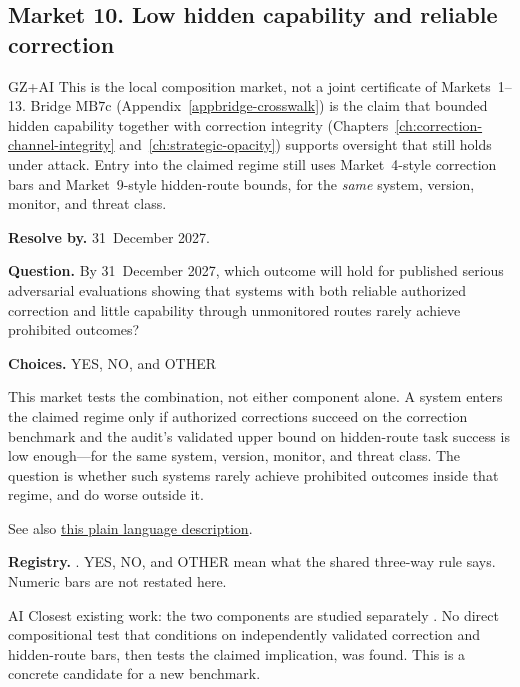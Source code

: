 \subsection{Market 10. Low hidden capability and reliable correction}
\label{sec:appp-m10}

\begin{authbar}{GZ+AI}
This is the local composition market, not a joint certificate of Markets~1--13.
Bridge \(\text{MB7c}\) (Appendix~\ref{appbridge-crosswalk}) is the claim that bounded hidden capability together with correction integrity (Chapters~\ref{ch:correction-channel-integrity} and~\ref{ch:strategic-opacity}) supports oversight that still holds under attack.
Entry into the claimed regime still uses Market~4-style correction bars and Market~9-style hidden-route bounds, for the \emph{same} system, version, monitor, and threat class.
\end{authbar}
\begin{predictionbox}
\textbf{Resolve by.} 31~December 2027.

\textbf{Question.}
By 31~December 2027, which outcome will hold for published serious adversarial evaluations showing that systems with both reliable authorized correction and little capability through unmonitored routes rarely achieve prohibited outcomes?

\textbf{Choices.} YES, NO, and OTHER
\end{predictionbox}
\begin{predictionbackground}
This market tests the combination, not either component alone.
A system enters the claimed regime only if authorized corrections succeed on the correction benchmark and the audit's validated upper bound on hidden-route task success is low enough---for the same system, version, monitor, and threat class.
The question is whether such systems rarely achieve prohibited outcomes inside that regime, and do worse outside it.

See also \href{https://towards-alignment.com/cards/correction-channel-integrity/}{this plain language description}.
\end{predictionbackground}
\begin{predictionresolution}
\textbf{Registry.} . YES, NO, and OTHER mean what the shared three-way rule says. Numeric bars are not restated here.
\end{predictionresolution}
\begin{authbar}{AI}
Closest existing work: the two components are studied separately \autocite{controlarena2026,aisi2026sandboxescape,schlatter2026shutdownresistance,greenblatt2024alignmentfaking}.
No direct compositional test that conditions on independently validated correction and hidden-route bars, then tests the claimed implication, was found.
This is a concrete candidate for a new benchmark.
\end{authbar}
\authbarneedspace

